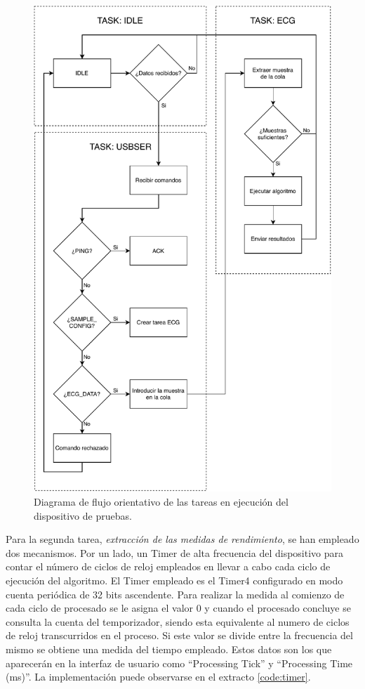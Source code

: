         \begin{figure}
                \centering
                        \includegraphics[width = 0.78 \linewidth]{figuras/TivaWorkFlow.pdf}
                \caption{Diagrama de flujo orientativo de las tareas en ejecución del dispositivo de pruebas.}
                \label{fig:tivaFlow}
        \end{figure}
        
        Para la segunda tarea, \textit{extracción de las medidas de rendimiento}, se han empleado dos mecanismos. 
        Por un lado, un Timer de alta frecuencia del dispositivo para contar el número de ciclos de reloj empleados en llevar a cabo cada ciclo de ejecución del algoritmo. El Timer empleado es el Timer4 configurado en modo cuenta periódica de 32 bits ascendente. Para realizar la medida al comienzo de cada ciclo de procesado se le asigna el valor 0 y cuando el procesado concluye se consulta la cuenta del temporizador, siendo esta equivalente al numero de ciclos de reloj transcurridos en el proceso. Si este valor se divide entre la frecuencia del mismo se obtiene una medida del tiempo empleado. Estos datos son los que aparecerán en la interfaz de usuario como ``Processing Tick'' y ``Processing Time (ms)''. La implementación puede observarse en el extracto \ref{code:timer}.
        
